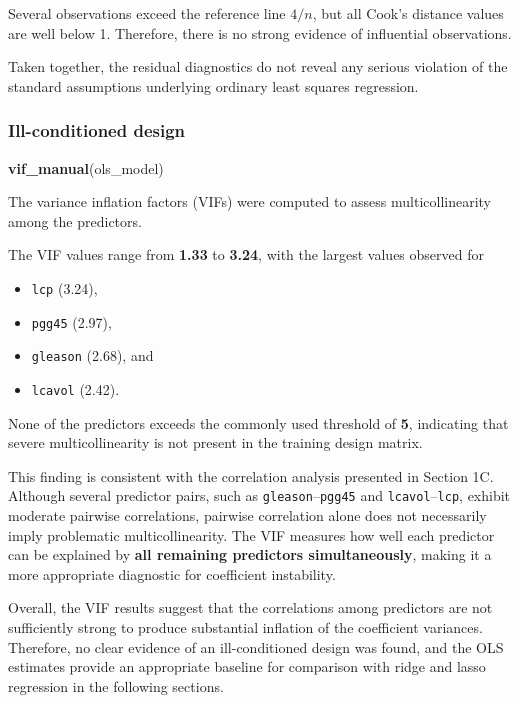 \documentclass[
  11pt,
]{article}
\newenvironment{Shaded}{\begin{snugshade}}{\end{snugshade}}
\newcommand{\FunctionTok}[1]{\textcolor[rgb]{0.13,0.29,0.53}{\textbf{#1}}}
\newcommand{\NormalTok}[1]{#1}
\providecommand{\tightlist}{%
  \setlength{\itemsep}{0pt}\setlength{\parskip}{0pt}}
\begin{document}
Several observations exceed the reference line \(4/n\), but all Cook's
distance values are well below 1. Therefore, there is no strong evidence
of influential observations.

Taken together, the residual diagnostics do not reveal any serious
violation of the standard assumptions underlying ordinary least squares
regression.

\subsubsection{Ill-conditioned design}\label{ill-conditioned-design}

\begin{Shaded}
\begin{Highlighting}[]
\FunctionTok{vif\_manual}\NormalTok{(ols\_model)}
\end{Highlighting}
\end{Shaded}

The variance inflation factors (VIFs) were computed to assess
multicollinearity among the predictors.

The VIF values range from \textbf{1.33} to \textbf{3.24}, with the
largest values observed for

\begin{itemize}
\tightlist
\item
  \texttt{lcp} (3.24),
\item
  \texttt{pgg45} (2.97),
\item
  \texttt{gleason} (2.68), and
\item
  \texttt{lcavol} (2.42).
\end{itemize}

None of the predictors exceeds the commonly used threshold of
\textbf{5}, indicating that severe multicollinearity is not present in
the training design matrix.

This finding is consistent with the correlation analysis presented in
Section 1C. Although several predictor pairs, such as
\texttt{gleason}--\texttt{pgg45} and \texttt{lcavol}--\texttt{lcp},
exhibit moderate pairwise correlations, pairwise correlation alone does
not necessarily imply problematic multicollinearity. The VIF measures
how well each predictor can be explained by \textbf{all remaining
predictors simultaneously}, making it a more appropriate diagnostic for
coefficient instability.

Overall, the VIF results suggest that the correlations among predictors
are not sufficiently strong to produce substantial inflation of the
coefficient variances. Therefore, no clear evidence of an
ill-conditioned design was found, and the OLS estimates provide an
appropriate baseline for comparison with ridge and lasso regression in
the following sections.
\end{document}
